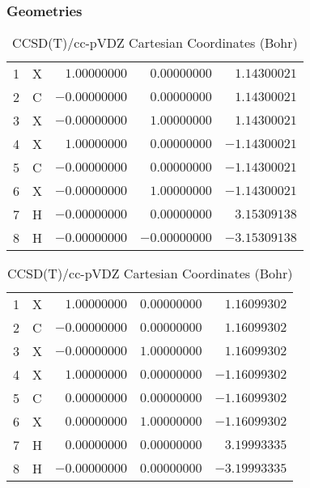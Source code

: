\documentclass[10pt,oneside]{article}
\begin{document}
\begin{table}[h!]
\subsubsection*{Geometries}
\begin{multicols}{2}
\centering
\caption{CCSD(T)/cc-pVTZ Cartesian Coordinates (Bohr)}
\begin{tabular}{llrrr}
\toprule
1  & X  & $ 1.00000000$ & $ 0.00000000$ & $ 1.14300021$ \\
2  & C  & $-0.00000000$ & $ 0.00000000$ & $ 1.14300021$ \\
3  & X  & $-0.00000000$ & $ 1.00000000$ & $ 1.14300021$ \\
4  & X  & $ 1.00000000$ & $ 0.00000000$ & $-1.14300021$ \\
5  & C  & $-0.00000000$ & $ 0.00000000$ & $-1.14300021$ \\
6  & X  & $-0.00000000$ & $ 1.00000000$ & $-1.14300021$ \\
7  & H  & $-0.00000000$ & $ 0.00000000$ & $ 3.15309138$ \\
8  & H  & $-0.00000000$ & $-0.00000000$ & $-3.15309138$ \\
\bottomrule
\end{tabular}
\caption{CCSD(T)/cc-pVDZ Cartesian Coordinates (Bohr)}
\begin{tabular}{llrrr}
\toprule
1  & X  & $ 1.00000000$ & $ 0.00000000$ & $ 1.16099302$ \\
2  & C  & $-0.00000000$ & $ 0.00000000$ & $ 1.16099302$ \\
3  & X  & $-0.00000000$ & $ 1.00000000$ & $ 1.16099302$ \\
4  & X  & $ 1.00000000$ & $ 0.00000000$ & $-1.16099302$ \\
5  & C  & $ 0.00000000$ & $ 0.00000000$ & $-1.16099302$ \\
6  & X  & $ 0.00000000$ & $ 1.00000000$ & $-1.16099302$ \\
7  & H  & $ 0.00000000$ & $ 0.00000000$ & $ 3.19993335$ \\
8  & H  & $-0.00000000$ & $ 0.00000000$ & $-3.19993335$ \\
\bottomrule
\end{tabular}
\end{multicols}
\end{table}
\end{document}
